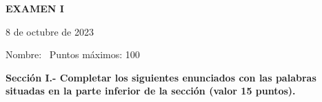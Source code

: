 \documentclass[10pt,addpoints]{exam}
\begin{document}
\begin{center}
  \sffamily\textbf{EXAMEN I}
\end{center}
\begin{flushright}
8 de octubre de 2023
\end{flushright}
Nombre:~\makebox[4in]{\hrulefill}
Puntos máximos: 100

\begin{questions}

\begin{EnvFullwidth}
  \sffamily\textbf{Sección I.- Completar los siguientes enunciados con las
  palabras situadas en la parte inferior de la sección (valor 15 puntos).}
\end{EnvFullwidth}






















\end{questions}
\end{document}
